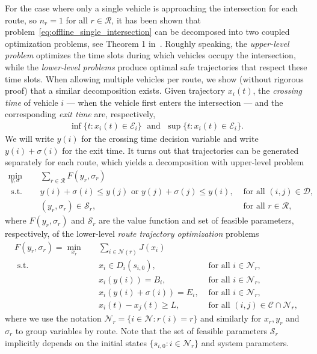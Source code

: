 \documentclass{article}
\theoremstyle{definition}
\theoremstyle{plain}
\begin{document}
For the case where only a single vehicle is approaching the intersection for
each route, so $n_{r} = 1$ for all $r \in \mathcal{R}$, it has been shown
that problem~\eqref{eq:offline_single_intersection} can be decomposed into two coupled optimization problems, see
Theorem 1 in~\cite{hultApproximateSolutionOptimal2015}. Roughly speaking, the \textit{upper-level problem} optimizes the time
slots during which vehicles occupy the intersection, while the \textit{lower-level problems}
produce optimal safe trajectories that respect these time slots.
%
When allowing multiple vehicles per route, we show (without rigorous proof) that
a similar decomposition exists.
%
Given trajectory $x_{i}(t)$, the \textit{crossing time} of vehicle $i$ --- when the vehicle
first enters the intersection --- and the corresponding \textit{exit time} are, respectively,
\begin{align*}
  \inf \{ t: x_{i}(t) \in \mathcal{E}_{i} \}  \; \text{ and } \; \sup \{ t: x_{i}(t) \in \mathcal{E}_{i} \} .
\end{align*}
%
We will write $y(i)$ for the crossing time decision variable and write
$y(i) + \sigma(i)$ for the exit time. It turns out that trajectories can be generated
separately for each route, which yields a decomposition with upper-level problem
%
\begin{equation}
\begin{aligned}
  \min_{y, \sigma} \quad & \sum_{r \in \mathcal{R}} F(y_{r}, \sigma_{r}) \\
  \text{ s.t. } \quad & y(i) + \sigma(i) \leq y(j) \text{ or } y(j) + \sigma(j) \leq y(i), & \text{ for all } (i, j) \in \mathcal{D} , \\
  & (y_{r}, \sigma_{r}) \in \mathcal{S}_{r} , & \text{ for all } r \in \mathcal{R} ,
\end{aligned}
\end{equation}
where $F(y_{r}, \sigma_{r})$ and $\mathcal{S}_{r}$ are the value function and
set of feasible parameters, respectively, of the lower-level \textit{route trajectory optimization}
problems
\begin{equation}
\begin{aligned}
  F(y_{r}, \sigma_{r}) = \min_{x_{r}} \quad & \sum_{i \in \mathcal{N}(r)} J(x_{i}) \\
  \text{ s.t. } \quad & x_{i} \in D_{i}(s_{i,0}) , & \text{ for all } i \in \mathcal{N}_{r} , \\
  & x_{i}(y(i)) = B_{i} , & \text{ for all } i \in \mathcal{N}_{r} , \\
  & x_{i}(y(i) + \sigma(i)) = E_{i} , & \text{ for all } i \in \mathcal{N}_{r} , \\
  & x_{i}(t) - x_{j}(t) \geq L , & \text{ for all } (i, j) \in \mathcal{C} \cap \mathcal{N}_{r} ,
\end{aligned}
\end{equation}
where we use the notation $\mathcal{N}_{r} = \{ i \in \mathcal{N} : r(i) = r \}$ and
similarly for $x_{r}, y_{r}$ and $\sigma_{r}$ to group variables by route. Note that
the set of feasible parameters $\mathcal{S}_{r}$ implicitly depends on the
initial states $\{s_{i,0} : i \in \mathcal{N}_{r}\}$ and system parameters.
\end{document}

